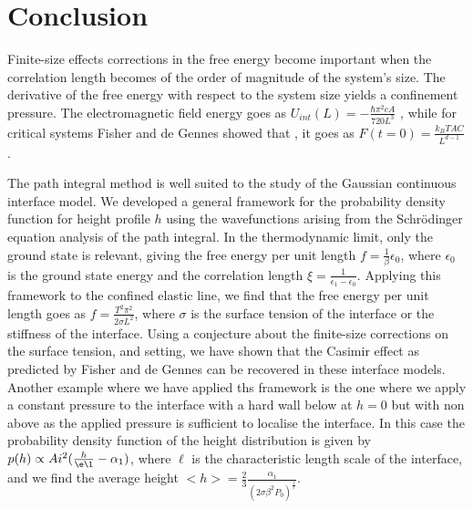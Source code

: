 \section{Conclusion}

Finite-size effects corrections in the free energy become important when the correlation length becomes of the order of magnitude of the system's size. The derivative of the free energy with respect to the system size yields a confinement pressure. The electromagnetic field energy goes as $U_{int}(L) = -\frac{\hbar \pi^2 c A}{720 L^3}$ \cite{h_b_g_casimir_attraction_1948,sm_rytov_principles_1989,lifshits_theory_1955}, while for critical systems Fisher and de Gennes showed that  \cite{amit_field_2005}, it goes as $F(t=0) = \frac{k_B T A C}{L^{d-1}}$ \cite{gambassi_casimir_2009}.

The path integral method \cite{matsubara_new_1955} is well suited to the study of the Gaussian continuous interface model. We developed a general framework for the probability density function for height profile $h$ using the wavefunctions arising from the Schr\"odinger equation analysis of the path integral. In the thermodynamic limit, only the ground state  is relevant, giving the free energy per unit length $f= \frac{1}{\beta}\epsilon_0$, where $\epsilon_0$ is the ground state energy and the correlation length $\xi = \frac{1}{\epsilon_1-\epsilon_0}$. 
Applying this framework to the confined elastic line, we find that the free energy per unit length goes as $f = \frac{T^2 \pi^2}{2 \sigma L^2}$, where $\sigma$ is the surface tension of the interface or the stiffness of the interface. Using a conjecture \cite{privman_finite-size_1988-1} about the finite-size corrections on the surface tension, and setting, we have shown that the Casimir effect as predicted by Fisher and de Gennes can be recovered in these interface models. 
Another example where we have applied ths framework is the one where we apply a constant pressure to the interface with a hard wall below at $h=0$ but with non above as the applied pressure is sufficient to localise the interface. In this case the probability density function of the height distribution is given by $p(h) \propto Ai^2(\frac{h}{\e\l}-\alpha_1)$, where $\ell$ is the characteristic length scale of the interface, and we  find the average height $<h> = \frac{2}{3}\frac{\alpha_1}{\left(2\sigma \beta^2 P_0 \right)^\frac{1}{3}}$.

